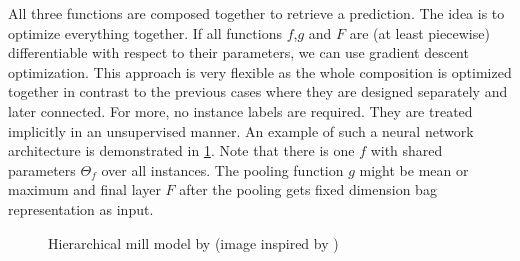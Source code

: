 All three functions are composed together to retrieve a prediction. The idea is to optimize everything together. If all functions $f$,$g$ and $F$ are (at least piecewise) differentiable with respect to their parameters, we can use gradient descent optimization. \cite{Pevny2016a, Edwards2017} This approach is very flexible as the whole composition is optimized together in contrast to the previous cases where they are designed separately and later connected. For more, no instance labels are required. They are treated implicitly in an unsupervised manner. An example of such a neural network architecture is demonstrated in \ref{fig:hmill}. Note that there is one $f$ with shared parameters $\Theta_{f}$ over all instances. The pooling function $g$ might be mean or maximum and final layer $F$ after the pooling gets fixed dimension bag representation as input.

\begin{figure}[!ht]
    \centering
    \caption{Hierarchical mill model by \cite{Pevny2016a} (image inspired by \cite{Mandlik2020})}
    \label{fig:hmill}
\end{figure}

